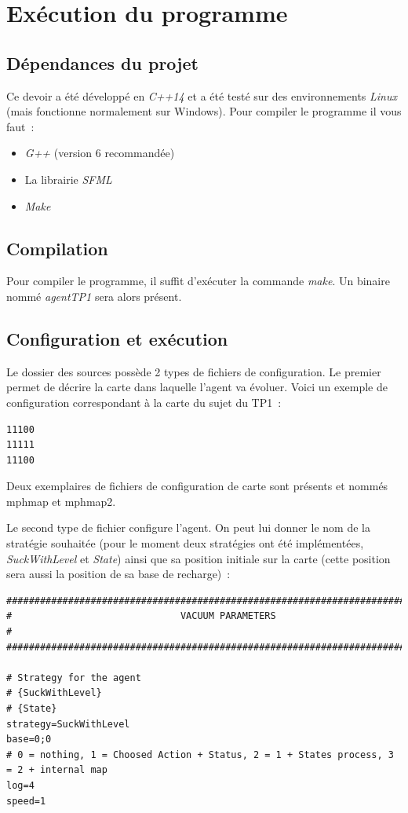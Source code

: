 \documentclass{article}
\begin{document}
\section{Exécution du programme}
\subsection{Dépendances du projet}
Ce devoir a été développé en \emph{C++14} et a été testé sur des environnements
\emph{Linux} (mais fonctionne normalement sur Windows). Pour compiler le
programme il vous faut~:
\begin{itemize}
    \item \emph{G++} (version 6 recommandée)
    \item La librairie \emph{SFML}
    \item \emph{Make}
\end{itemize}
\subsection{Compilation}
Pour compiler le programme, il suffit d'exécuter la commande \emph{make}. Un
binaire nommé \emph{agentTP1} sera alors présent.
\subsection{Configuration et exécution}
Le dossier des sources possède 2 types de fichiers de configuration. Le premier
permet de décrire la carte dans laquelle l'agent va évoluer. Voici un exemple de
configuration correspondant à la carte du sujet du TP1~:
\begin{verbatim}
11100
11111
11100
\end{verbatim}
Deux exemplaires de fichiers de configuration de carte sont présents et nommés
mph{map} et mph{map2}.

Le second type de fichier configure l'agent. On peut lui donner le nom de la
stratégie souhaitée (pour le moment deux stratégies ont été implémentées,
\emph{SuckWithLevel} et \emph{State}) ainsi que sa position initiale sur la
carte (cette position sera aussi la position de sa base de recharge)~:

\begin{verbatim}
###############################################################################
#                              VACUUM PARAMETERS                              #
###############################################################################

# Strategy for the agent
# {SuckWithLevel}
# {State}
strategy=SuckWithLevel
base=0;0
# 0 = nothing, 1 = Choosed Action + Status, 2 = 1 + States process, 3 = 2 + internal map
log=4
speed=1
\end{verbatim}
\end{document}
